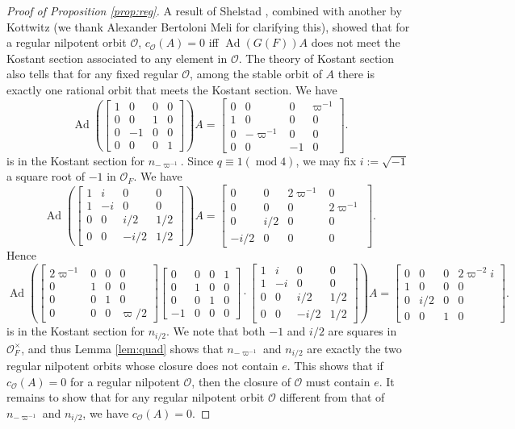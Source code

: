 \documentclass[11pt]{amsart}
\theoremstyle{remark}
\newcommand{\cO}{\mathcal{O}}
\newcommand{\Ad}{\operatorname{Ad}}
\newcommand{\matr}[1]{\left[\begin{matrix}#1\end{matrix}\right]}
\begin{document}
\begin{proof}[Proof of Proposition \ref{prop:reg}]
A result of Shelstad \cite{Sh89}, combined with another by Kottwitz \cite[Thm. 5.1]{Kot99} (we thank Alexander Bertoloni Meli for clarifying this), showed that for a regular nilpotent orbit $\cO$, $c_{\cO}(A)=0$ iff $\Ad(G(F))A$ does not meet the Kostant section associated to any element in $\cO$. The theory of Kostant section also tells that for any fixed regular $\cO$, among the stable orbit of $A$ there is exactly one rational orbit that meets the Kostant section. We have
\[
\Ad(\matr{1&0&0&0\\0&0&1&0\\0&-1&0&0\\0&0&0&1})A=\matr{0&0&0&\varpi^{-1}\\1&0&0&0\\0&-\varpi^{-1}&0&0\\0&0&-1&0}.
\]
is in the Kostant section for $n_{-\varpi^{-1}}$. Since $q\equiv 1(\operatorname{mod}4)$, we may fix $i:=\sqrt{-1}$ a square root of $-1$ in $\cO_F$. We have
\[
\Ad(\matr{1&i&0&0\\1&-i&0&0\\0&0&i/2&1/2\\0&0&-i/2&1/2})A=\matr{0&0&2\varpi^{-1}&0\\0&0&0&2\varpi^{-1}\\0&i/2&0&0\\-i/2&0&0&0}.
\]
Hence
\[
\Ad(\matr{2\varpi^{-1}&0&0&0\\0&1&0&0\\0&0&1&0\\0&0&0&\varpi/2}\matr{0&0&0&1\\0&1&0&0\\0&0&1&0\\-1&0&0&0}\cdot\matr{1&i&0&0\\1&-i&0&0\\0&0&i/2&1/2\\0&0&-i/2&1/2})A=\matr{0&0&0&2\varpi^{-2}i\\1&0&0&0\\0&i/2&0&0\\0&0&1&0}.
\]
is in the Kostant section for $n_{i/2}$. We note that both $-1$ and $i/2$ are squares in $\cO_F^{\times}$, and thus Lemma \ref{lem:quad} shows that $n_{-\varpi^{-1}}$ and $n_{i/2}$ are exactly the two regular nilpotent orbits whose closure does not contain $e$. This shows that if $c_{\cO}(A)=0$ for a regular nilpotent $\cO$, then the closure of $\cO$ must contain $e$. It remains to show that for any regular nilpotent orbit $\cO$ different from that of $n_{-\varpi^{-1}}$ and $n_{i/2}$, we have $c_{\cO}(A)=0$.


\end{proof}
\end{document}
